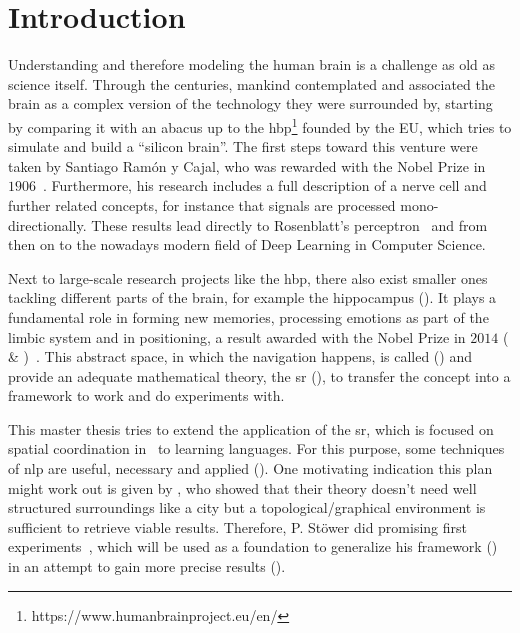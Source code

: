 \chapter{Introduction} \label{ch: introduction}
Understanding and therefore modeling the human brain is a challenge as old as science itself. Through the centuries, mankind contemplated and associated the brain as a complex version of the technology they were surrounded by, starting by comparing it with an abacus up to the \gls{hbp}\footnote{https://www.humanbrainproject.eu/en/} founded by the EU, which tries to simulate and build a ``silicon brain''. The first steps toward this venture were taken by Santiago Ramón y Cajal, who was rewarded with the Nobel Prize in $ 1906 $~\cite{Nobelprize06}. Furthermore, his research includes a full description of a nerve cell and further related concepts, for instance that signals are processed mono-directionally. These results lead directly to Rosenblatt's perceptron~\cite{Rosenblatt58P} and from then on to the nowadays modern field of Deep Learning in Computer Science.

Next to large-scale research projects like the \gls{hbp}, there also exist smaller ones tackling different parts of the brain, for example the hippocampus (). It plays a fundamental role in forming new memories, processing emotions as part of the limbic system and in positioning, a result awarded with the Nobel Prize in $ 2014 $ ( \& )~\cite{Nobelprize14}. This abstract space, in which the navigation happens, is called \cognitiveroom{} () and  provide an adequate mathematical theory, the \gls{sr} (), to transfer the concept into a framework to work and do experiments with.

This master thesis tries to extend the application of the \gls{sr}, which is focused on spatial coordination in~\cite{StBoGe17HPM} to learning languages. For this purpose, some techniques of \gls{nlp} are useful, necessary and applied (). One motivating indication this plan might work out is given by , who showed that their theory doesn't need well structured surroundings like a city but a topological/graphical environment is sufficient to retrieve viable results. Therefore, P. Stöwer did promising first experiments~\cite{Stöwer21MA}, which will be used as a foundation to generalize his framework () in an attempt to gain more precise results ().
